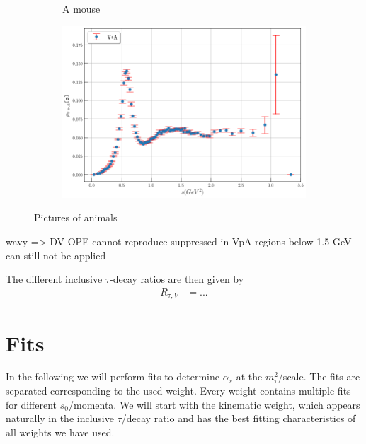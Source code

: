 \documentclass[../../index.tex]{subfiles}
\begin{document}
\begin{figure}
\begin{subfigure}[b]{0.49\textwidth}
        \caption{A mouse}
        \label{fig:mouse}
    \end{subfigure}
    \begin{subfigure}[b]{0.8\textwidth}
      \centering
      \includegraphics[width=\textwidth]{./images/specFuncAleph_VpA.png}
      \label{fig:}
    \end{subfigure}
    \caption{Pictures of animals}\label{fig:animals}
\end{figure}

wavy => DV
OPE cannot reproduce
suppressed in VpA
regions below 1.5 GeV can still not be applied

The different inclusive $\tau$-decay ratios are then given by
\begin{align}
  R_{\tau,V} &= ...
\end{align}


\newpage
\section{Fits}
In the following we will perform fits to determine $\alpha_s$ at the
$m_\tau^2$\-/scale. The fits are separated corresponding to the used weight. Every
weight contains multiple fits for different $s_0$\-/momenta. We will start with
the kinematic weight, which appears naturally in the inclusive $\tau$\-/decay
ratio and has the best fitting characteristics of all weights we have used.
\end{document}
